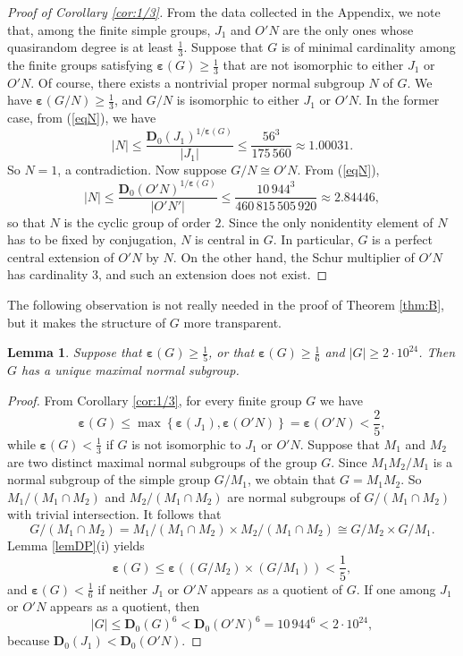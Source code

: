 \documentclass{daj}
\newtheorem{lemma}[theorem]{Lemma}
\theoremstyle{definition}
\theoremstyle{remark}
\newcommand{\D}{\mathbf{D}}
\renewcommand{\a}{\boldsymbol{\varepsilon}}
\begin{document}
\begin{proof}[Proof of Corollary \ref{cor:1/3}]
From the data collected in the Appendix,
we note that, among the finite simple groups, $J_1$ and $O'N$ are the only ones whose quasirandom degree is at least $\frac{1}{3}$.
Suppose that $G$ is of minimal cardinality among the finite groups satisfying
$\a(G) \geq \frac{1}{3}$ that are not isomorphic to either $J_1$ or $O'N$.
Of course, there exists a nontrivial proper normal subgroup $N$ of $G$.
We have $\a(G/N) \geq \frac{1}{3}$, and $G/N$ is isomorphic to either $J_1$ or $O'N$.
In the former case, from (\ref{eqN}), we have
$$ |N| \leq \frac{\D_0(J_1)^{1/\a(G)}}{|J_1|} \leq \frac{56^3}{175\,560} \approx 1.00031 . $$
So $N=1$, a contradiction.
Now suppose $G/N \cong O'N$. From (\ref{eqN}),
$$ |N| \leq \frac{\D_0(O'N)^{1/\a(G)}}{|O'N'|} \leq \frac{10 \, 944^3}{460\,815\,505\,920} \approx 2.84446 , $$
so that $N$ is the cyclic group of order $2$. 
Since the only nonidentity element of $N$ has to be fixed by conjugation, $N$ is central in $G$. In particular, $G$ is a perfect central extension of $O'N$ by $N$. On the other hand, the Schur multiplier of $O'N$ has cardinality $3$, and such an extension does not exist.
\end{proof} 

The following observation is not really needed in the proof of Theorem \ref{thm:B},
but it makes the structure of $G$ more transparent.

\begin{lemma} \label{lemUniqueM}
Suppose that $\a(G) \geq \frac{1}{5}$, or that $\a(G) \geq \frac{1}{6}$ and $|G| \geq 2 \cdot 10^{24}$.
Then $G$ has a unique maximal normal subgroup.
\end{lemma}
\begin{proof}
From Corollary \ref{cor:1/3}, for every finite group $G$ we have
$$ \a(G) \leq \max \left\{ \a(J_1) , \a(O'N) \right\} = \a(O'N) < \frac{2}{5} , $$
while $\a(G) <\frac{1}{3}$ if $G$ is not isomorphic to $J_1$ or $O'N$.
Suppose that $M_1$ and $M_2$ are two distinct maximal normal subgroups of the group $G$.
Since $M_1M_2/M_1$ is a normal subgroup of the simple group $G/M_1$, we obtain that $G=M_1M_2$.
So $M_1/(M_1 \cap M_2)$ and $M_2/(M_1 \cap M_2)$ are normal subgroups of $G/(M_1 \cap M_2)$ with trivial intersection.
It follows that
$$ G/(M_1\cap M_2) = M_1/(M_1\cap M_2) \times M_2/(M_1\cap M_2) \cong G/M_2 \times G/M_1 . $$
Lemma \ref{lemDP}(i) yields
$$ \a(G) \leq \a( (G/M_2) \times (G/M_1) ) < \frac{1}{5} , $$
and $\a(G) < \frac{1}{6}$ if neither $J_1$ or $O'N$ appears as a quotient of $G$.
If one among $J_1$ or $O'N$ appears as a quotient, then
$$ |G| \leq \D_0(G)^6 < \D_0(O'N)^6 = 10\,944^6 < 2 \cdot 10^{24} , $$
because $\D_0(J_1) < \D_0(O'N)$.
\end{proof}
\end{document}
